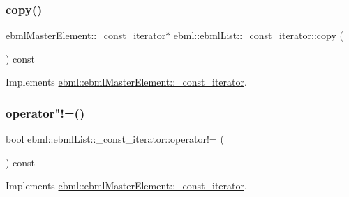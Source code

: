 \subsubsection{\texorpdfstring{copy()}{copy()}}
{\footnotesize\ttfamily \mbox{\hyperlink{classebml_1_1ebmlMasterElement_1_1__const__iterator}{ebml\+Master\+Element\+::\+\_\+const\+\_\+iterator}}$\ast$ ebml\+::ebml\+List\+::\+\_\+const\+\_\+iterator\+::copy (\begin{DoxyParamCaption}{ }\end{DoxyParamCaption}) const\hspace{0.3cm}{\ttfamily [virtual]}}



Implements \mbox{\hyperlink{classebml_1_1ebmlMasterElement_1_1__const__iterator_a64a4853ad363358987eb6492579cd503}{ebml\+::ebml\+Master\+Element\+::\+\_\+const\+\_\+iterator}}.

\mbox{\label{classebml_1_1ebmlList_1_1__const__iterator_a21d545577f7b61b40ce961d5c9a83cce}} 
\subsubsection{\texorpdfstring{operator"!=()}{operator!=()}}
{\footnotesize\ttfamily bool ebml\+::ebml\+List\+::\+\_\+const\+\_\+iterator\+::operator!= (\begin{DoxyParamCaption}\item[{const \mbox{\hyperlink{classebml_1_1ebmlMasterElement_1_1__const__iterator}{ebml\+Master\+Element\+::\+\_\+const\+\_\+iterator}} \&}]{ }\end{DoxyParamCaption}) const\hspace{0.3cm}{\ttfamily [virtual]}}



Implements \mbox{\hyperlink{classebml_1_1ebmlMasterElement_1_1__const__iterator_ac62d190e9da49236835f8219ec307d22}{ebml\+::ebml\+Master\+Element\+::\+\_\+const\+\_\+iterator}}.

\mbox{\label{classebml_1_1ebmlList_1_1__const__iterator_abc0aa1dd7a1d159c1a6f8c77e2736b80}} 
